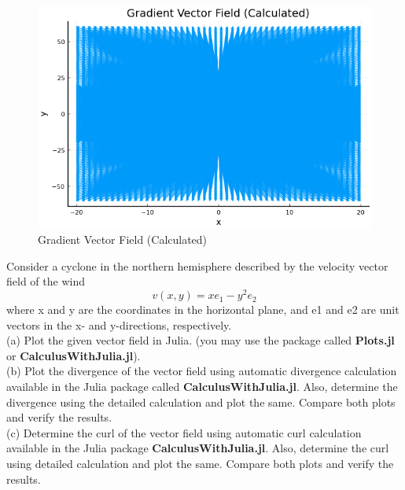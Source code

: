 \documentclass{homework}
\begin{document}
\begin{solution}
    \begin{figure}[H]
        \centering
        \includegraphics[width=0.5\linewidth]{media/gradientcal.png}
        \caption{Gradient Vector Field (Calculated)}
        \label{fig:calgradient}
    \end{figure}
\end{solution}

\question  Consider a cyclone in the northern hemisphere described by the velocity vector field of the wind
\[
   v(x,y) = xe_1 - y^2e_2
\]
where x and y are the coordinates in the horizontal plane, and e1 and e2 are unit vectors in the x- and
y-directions, respectively.\\
(a) Plot the given vector field in Julia. (you may use the package called \textbf{Plots.jl} or \textbf{CalculusWithJulia.jl}).\\
(b) Plot the divergence of the vector field using automatic divergence calculation available in the Julia package called \textbf{CalculusWithJulia.jl}. Also, determine the divergence using the detailed calculation and plot the same. Compare both plots and verify the results.\\
(c) Determine the curl of the vector field using automatic curl calculation available in the Julia package \textbf{CalculusWithJulia.jl}. Also, determine the curl using detailed calculation and plot the same. Compare both plots and verify the results.
\end{document}
